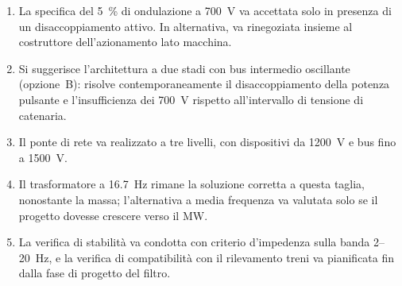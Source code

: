 \begin{enumerate}
\item La specifica del \SI{5}{\percent} di ondulazione a \SI{700}{\volt} va accettata solo
in presenza di un disaccoppiamento attivo. In alternativa, va rinegoziata insieme al
costruttore dell'azionamento lato macchina.
\item Si suggerisce l'architettura a due stadi con bus intermedio oscillante
(opzione~B): risolve contemporaneamente il disaccoppiamento della potenza pulsante e
l'insufficienza dei \SI{700}{\volt} rispetto all'intervallo di tensione di catenaria.
\item Il ponte di rete va realizzato a tre livelli, con dispositivi da
\SI{1200}{\volt} e bus fino a \SI{1500}{\volt}.
\item Il trasformatore a \SI{16.7}{\hertz} rimane la soluzione corretta a questa
taglia, nonostante la massa; l'alternativa a media frequenza va valutata solo se il
progetto dovesse crescere verso il \si{\mega\watt}.
\item La verifica di stabilità va condotta con criterio d'impedenza sulla banda
\SI{2}{}--\SI{20}{\hertz}, e la verifica di compatibilità con il rilevamento treni va
pianificata fin dalla fase di progetto del filtro.
\end{enumerate}


